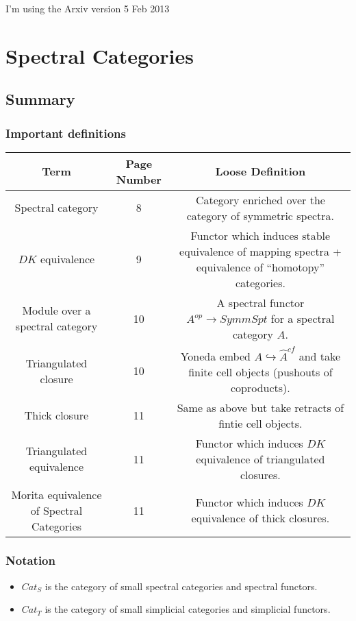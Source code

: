 \documentclass[letterpaper]{article}
\theoremstyle{definition}
\begin{document}
I'm using the Arxiv version 5 Feb 2013

\tableofcontents

\section{Spectral Categories}

\subsection{Summary}
\subsubsection{Important definitions}
\begin{tabulary}{0.7 \textwidth}{|C|C|C|}
\hline
Term & Page Number & Loose Definition\\
\hline
\hline
Spectral category & 8& Category enriched over the category of
                       symmetric spectra.\\
\hline
$DK$ equivalence &9& Functor which induces stable equivalence of mapping spectra +
                       equivalence of ``homotopy'' categories.\\
\hline
Module over a spectral category &10& A spectral functor $A^{op}
                                     \rightarrow SymmSpt$ for a spectral
                                     category $A$.\\
\hline
Triangulated closure &10 & Yoneda embed $A \hookrightarrow \widehat
                           A^{cf}$ and take finite cell objects
                           (pushouts of coproducts).\\
\hline
Thick closure &11 & Same as above but take retracts of fintie cell objects.\\
\hline
Triangulated equivalence  & 11& Functor which induces $DK$ equivalence of
                                triangulated closures.\\
\hline
Morita equivalence of Spectral Categories & 11& Functor which induces $DK$ equivalence of thick closures.\\
\hline
\end{tabulary}

\subsubsection{Notation}
\begin{itemize}
\item $Cat_S$ is the category of small spectral categories and
  spectral functors. 
\item $Cat_T$ is the category of small simplicial categories and
  simplicial functors. 
\end{itemize}
\end{document}
